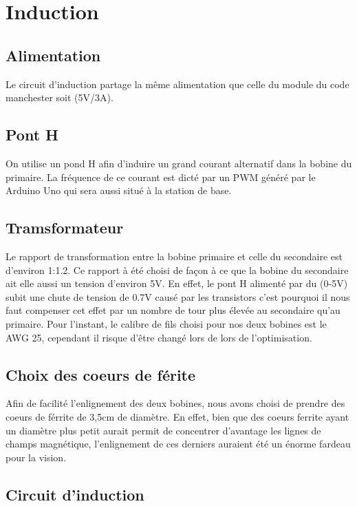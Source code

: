 \section{Induction}
\subsection{Alimentation}
Le circuit d'induction partage la même alimentation que celle du module du code manchester soit (5V/3A). 
\subsection{Pont H}
On utilise un pond H afin d'induire un grand courant alternatif dans la bobine du primaire. La fréquence de ce courant est dicté par un PWM généré par le Arduino Uno qui sera aussi situé à la station de base. 

\subsection{Tramsformateur}
Le rapport de transformation entre la bobine primaire et celle du secondaire est d'environ 1:1.2. Ce rapport à été choisi de façon à ce que la bobine du secondaire ait elle aussi un tension d'environ 5V. En effet, le pont H alimenté par du (0-5V) subit une chute de tension de 0.7V causé par les transistors c'est pourquoi il nous faut compenser cet effet par un nombre de tour plus élevée au secondaire qu'au primaire. Pour l'instant, le calibre de fils choisi pour nos deux bobines est le AWG 25, cependant il risque d'être changé lors de lors de l'optimisation.
\subsection{Choix des coeurs de férite}
Afin de facilité l'enlignement des deux bobines, nous avons choisi de prendre des coeurs de férrite de 3,5cm de diamètre. En effet, bien que des coeurs ferrite ayant un diamètre plus petit aurait permit de concentrer d'avantage les lignes de champs magnétique, l'enlignement de ces derniers auraient été un énorme fardeau pour la vision.


\subsection{Circuit d'induction}



